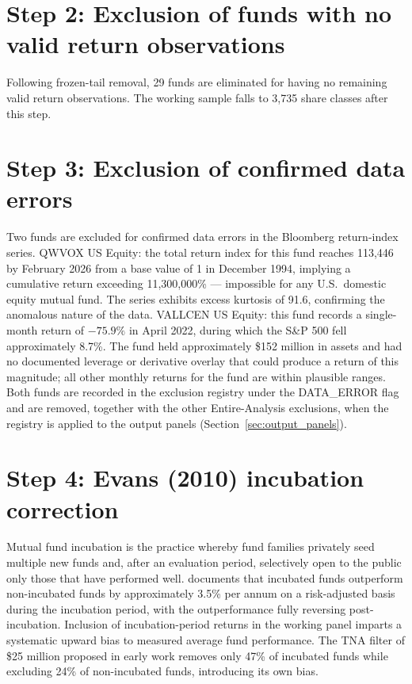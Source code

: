 \documentclass[12pt, oneside]{report}
\begin{document}
\section{Step 2: Exclusion of funds with no valid return observations}
\label{sec:empty_funds}

\noindent Following frozen-tail removal, 29 funds are eliminated for
having no remaining valid return observations. The working
sample falls to 3{,}735 share classes after this step.

\section{Step 3: Exclusion of confirmed data errors}
\label{sec:data_errors}

\noindent Two funds are excluded for confirmed data errors in the Bloomberg
return-index series. QWVOX US Equity: the total return
index for this fund reaches 113{,}446 by February 2026 from a base
value of 1 in December 1994, implying a cumulative return
exceeding 11{,}300{,}000\% --- impossible for any U.S.\ domestic
equity mutual fund. The series exhibits excess kurtosis of 91.6,
confirming the anomalous nature of the data. VALLCEN US
Equity: this fund records a single-month return of $-75.9\%$ in
April 2022, during which the S\&P 500 fell approximately 8.7\%. The
fund held approximately \$152 million in assets and had no documented
leverage or derivative overlay that could produce a return of this
magnitude; all other monthly returns for the fund are within plausible
ranges. Both funds are recorded in the exclusion registry under the
DATA\_ERROR flag and are removed, together with the other
Entire-Analysis exclusions, when the registry is applied to the output
panels (Section~\ref{sec:output_panels}).

\section{Step 4: Evans (2010) incubation correction}
\label{sec:evans_correction}

\noindent Mutual fund incubation is the practice whereby fund families
privately seed multiple new funds and, after an evaluation period,
selectively open to the public only those that have performed well.
\textcite{Evans2010} documents that incubated funds outperform
non-incubated funds by approximately 3.5\% per annum on a risk-adjusted
basis during the incubation period, with the outperformance fully
reversing post-incubation. Inclusion of incubation-period returns in
the working panel imparts a systematic upward bias to measured average
fund performance. The TNA filter of \$25 million proposed in early
work removes only 47\% of incubated funds while excluding 24\% of
non-incubated funds, introducing its own bias.
\end{document}
